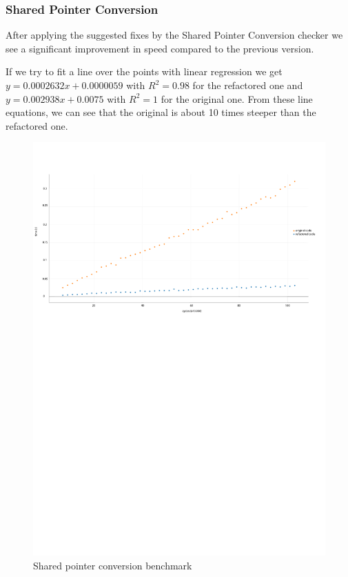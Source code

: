 \subsubsection{Shared Pointer Conversion}
\par After applying the suggested fixes by the Shared Pointer Conversion checker we see a significant improvement in speed compared to the previous version. \medskip
\par If we try to fit a line over the points with linear regression we get $y=0.0002632x+0.0000059$ with $R^2=0.98$ for the refactored one and $y = 0.002938x+0.0075$ with $R^2=1$ for the original one. From these line equations, we can see that the original is about 10 times steeper than the refactored one.
\begin{figure}[H]
	\caption{Shared pointer conversion benchmark}
	\includegraphics[scale=0.7]{images/shared_ptr_performance.pdf}
\end{figure}
